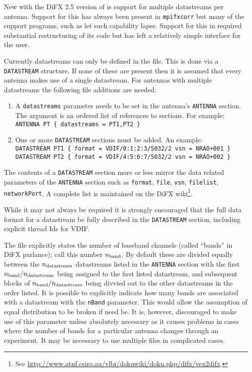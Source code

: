 \documentclass[12pt]{article}
\begin{document}
New with the DiFX 2.5 version of \vexdifx is support for multiple datastreams per antenna.
Support for this has always been present in {\tt mpifxcorr} but many of the support programs, such as \vexdifx let such capability lapse.
Support for this in \vexdifx required substantial restructuring of its code but has left a relatively simple interface for the user.

Currently datastreams can only be defined in the \vd file.
This is done via a {\tt DATASTREAM} structure.
If none of these are present then it is assumed that every antenna makes use of a single datastream.
For antennas with multiple datastreams the following \vd file additions are needed:
\begin{enumerate}
\item A {\tt datastreams} parameter needs to be set in the antenna's {\tt ANTENNA} section.
The argument is an ordered list of references to  sections.
For example: \\

{\tt ANTENNA PT \{ datastreams = PT1,PT2 \}} \\

\item One or more {\tt DATASTREAM} sections must be added.
An example:\\

{\tt DATASTREAM PT1 \{ format = VDIF/0:1:2:3/5032/2 vsn = NRAO+001 \} } \\

{\tt DATASTREAM PT2 \{ format = VDIF/4:5:6:7/5032/2 vsn = NRAO+002 \} } \\

\end{enumerate}

The contents of a {\tt DATASTREAM} section more or less mirror the data related parameters of the {\tt ANTENNA} section such as {\tt format}, {\tt file},  {\tt vsn}, {\tt filelist}, {\tt networkPort}.
A complete list is maintained on the DiFX wiki\footnote{See \url{http://www.atnf.csiro.au/vlbi/dokuwiki/doku.php/difx/vex2difx}.}.

While it may not always be required it is strongly encouraged that the full data format for a datastream be fully described in the {\tt DATASTREAM} section, including explicit thread Ids for VDIF.

The \vx file explicitly states the number of baseband channels (called ``bands'' in DiFX parlance); call this number $n_{\rm band}$.
By default these are divided equally between the $n_{\rm datastream}$ datastreams listed in the {\tt ANTENNA} section with the first $n_{\rm band}/n_{\rm datastream}$ being assigned to the first listed datastream, and subsequent blocks of $n_{\rm band}/n_{\rm datastream}$ being divvied out to the other datastreams in the order listed.
It is possible to explicitly indicate how many bands are associated with a datastream with the {\tt nBand} parameter.
This would allow the assumption of equal distribution to be broken if need be.
It is, however, discouraged to make use of this parameter unless absolutely necessary as it causes problems in cases where the number of bands for a particular antenna changes through an experiment.
It may be necessary to use multiple \vd files in complicated cases.
\end{document}

